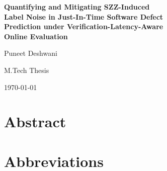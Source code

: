 \documentclass[12pt,a4paper,oneside]{report}
\begin{document}
\begin{titlepage}
\centering
\vspace*{2cm}
{\LARGE\bfseries Quantifying and Mitigating SZZ-Induced\\[0.3em]
 Label Noise in Just-In-Time Software Defect\\[0.3em]
 Prediction under Verification-Latency-Aware\\[0.3em]
 Online Evaluation\par}
\vspace{2.5cm}
{\Large Puneet Deshwani\par}
\vspace{0.6cm}
{\large M.Tech Thesis\par}
\vfill
{\large \today\par}
\end{titlepage}

\setcounter{page}{1}

\chapter*{Abstract}


\chapter*{Abbreviations}


\tableofcontents
\listoffigures

\cleardoublepage
{}
\setcounter{page}{1}







% 
% 
% 
% 

% 
% 
\end{document}
